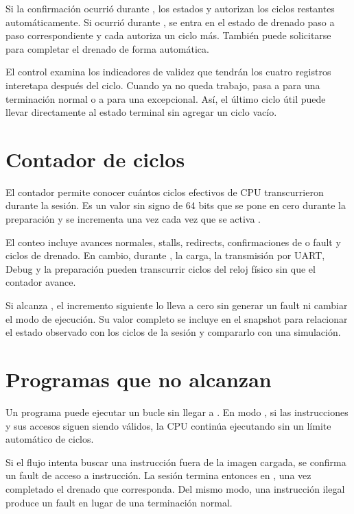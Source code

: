 Si la confirmación ocurrió durante , los estados
 y  autorizan los ciclos restantes
automáticamente. Si ocurrió durante , se entra en el estado de
drenado paso a paso correspondiente y cada  autoriza un ciclo más.
También puede solicitarse  para completar el drenado de forma
automática.

El control examina los indicadores de validez que tendrán los cuatro registros
interetapa después del ciclo. Cuando ya no queda trabajo, pasa a
 para una terminación normal o a  para una
excepcional. Así, el último ciclo útil puede llevar directamente al estado
terminal sin agregar un ciclo vacío.

\section{Contador de ciclos}

El contador  permite conocer cuántos ciclos efectivos de CPU
transcurrieron durante la sesión. Es un valor sin signo de 64 bits que se pone
en cero durante la preparación y se incrementa una vez cada vez que se activa
.

El conteo incluye avances normales, stalls, redirects, confirmaciones de
 o fault y ciclos de drenado. En cambio, durante , la
carga, la transmisión por UART, Debug y la preparación pueden transcurrir
ciclos del reloj físico sin que el contador avance.

Si alcanza , el incremento siguiente lo lleva a cero
sin generar un fault ni cambiar el modo de ejecución. Su valor completo se
incluye en el snapshot para relacionar el estado observado con los ciclos de la
sesión y compararlo con una simulación.

\section{Programas que no alcanzan }

Un programa puede ejecutar un bucle sin llegar a . En modo
, si las instrucciones y sus accesos siguen siendo válidos, la CPU
continúa ejecutando sin un límite automático de ciclos.

Si el flujo intenta buscar una instrucción fuera de la imagen cargada, se
confirma un fault de acceso a instrucción. La sesión termina entonces en
, una vez completado el drenado que corresponda. Del mismo modo,
una instrucción ilegal produce un fault en lugar de una terminación normal.

